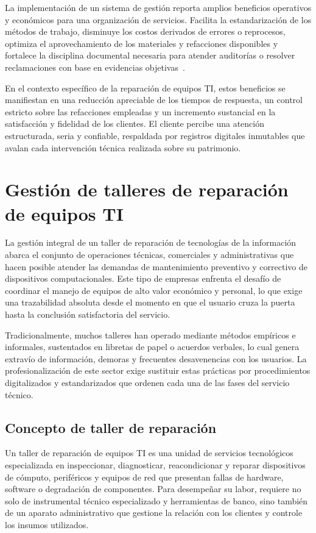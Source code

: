 La implementación de un sistema de gestión reporta amplios beneficios operativos y económicos para una organización de servicios. Facilita la estandarización de los métodos de trabajo, disminuye los costos derivados de errores o reprocesos, optimiza el aprovechamiento de los materiales y refacciones disponibles y fortalece la disciplina documental necesaria para atender auditorías o resolver reclamaciones con base en evidencias objetivas~\cite{laudon2020management, iso9001_2015}.

En el contexto específico de la reparación de equipos TI, estos beneficios se manifiestan en una reducción apreciable de los tiempos de respuesta, un control estricto sobre las refacciones empleadas y un incremento sustancial en la satisfacción y fidelidad de los clientes. El cliente percibe una atención estructurada, seria y confiable, respaldada por registros digitales inmutables que avalan cada intervención técnica realizada sobre su patrimonio.

\section{Gestión de talleres de reparación de equipos TI}

La gestión integral de un taller de reparación de tecnologías de la información abarca el conjunto de operaciones técnicas, comerciales y administrativas que hacen posible atender las demandas de mantenimiento preventivo y correctivo de dispositivos computacionales. Este tipo de empresas enfrenta el desafío de coordinar el manejo de equipos de alto valor económico y personal, lo que exige una trazabilidad absoluta desde el momento en que el usuario cruza la puerta hasta la conclusión satisfactoria del servicio.

Tradicionalmente, muchos talleres han operado mediante métodos empíricos e informales, sustentados en libretas de papel o acuerdos verbales, lo cual genera extravío de información, demoras y frecuentes desavenencias con los usuarios. La profesionalización de este sector exige sustituir estas prácticas por procedimientos digitalizados y estandarizados que ordenen cada una de las fases del servicio técnico.

\subsection{Concepto de taller de reparación}

Un taller de reparación de equipos TI es una unidad de servicios tecnológicos especializada en inspeccionar, diagnosticar, reacondicionar y reparar dispositivos de cómputo, periféricos y equipos de red que presentan fallas de hardware, software o degradación de componentes. Para desempeñar su labor, requiere no solo de instrumental técnico especializado y herramientas de banco, sino también de un aparato administrativo que gestione la relación con los clientes y controle los insumos utilizados.

